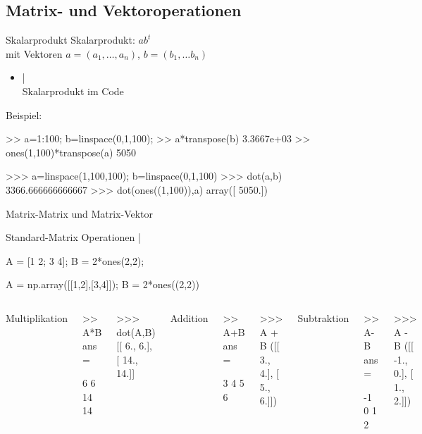 \documentclass[hyperref={xetex}]{beamer}
\begin{document}
\subsection{Matrix- und Vektoroperationen}
%
%
\begin{frame}[fragile]{Skalarprodukt}
Skalarprodukt: $a b^t$\\ mit 
Vektoren $a=(a_1, \dots ,a_n)$, $b=(b_1, \dots b_n)$ \\
\begin{itemize}
\item {} | \\
  Skalarprodukt im Code
\end{itemize}
Beispiel:
\begin{matlabin}
>> a=1:100; b=linspace(0,1,100);
>> a*transpose(b)
   3.3667e+03
>> ones(1,100)*transpose(a)
        5050
\end{matlabin} 
\begin{pyin}
>>> a=linspace(1,100,100); b=linspace(0,1,100)
>>> dot(a,b)
3366.666666666667
>>> dot(ones((1,100)),a)
array([ 5050.])
\end{pyin}
\end{frame}
%
%
\begin{frame}[fragile]{Matrix-Matrix und Matrix-Vektor}

  Standard-Matrix Operationen \imatlab{+,-,*} | 
\begin{matlabin}
A = [1 2; 3 4]; B = 2*ones(2,2);
\end{matlabin}
\begin{pyin}
A = np.array([[1,2],[3,4]]); B = 2*ones((2,2))
\end{pyin}
\begin{columns}[t]%
%
Multiplikation
\begin{matlabin}
>>  A*B
ans =

     6     6
    14    14
\end{matlabin}
\begin{pyin}
>>> dot(A,B)
[[  6.,   6.],
 [ 14.,  14.]]
\end{pyin}
%
Addition
\begin{matlabin}
>> A+B
ans =

     3     4
     5     6
\end{matlabin}
\begin{pyin}
>>> A + B
([[ 3.,  4.],
  [ 5.,  6.]])
\end{pyin}

%
Subtraktion
\begin{matlabin}
>> A-B
ans =

    -1     0
     1     2
\end{matlabin}
\begin{pyin}
>>> A - B
([[ -1.,  0.],
  [ 1.,  2.]])
\end{pyin}
\end{columns}
\end{frame}
\end{document}
